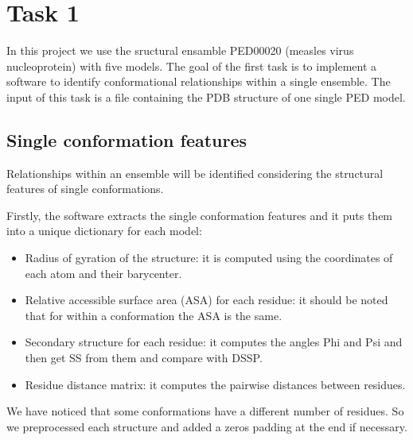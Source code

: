 \section{Task 1}\label{sec:task1}
\graphicspath{ {./figures/} }

In this project we use the sructural ensamble PED00020 (measles virus nucleoprotein) with five models.
The goal of the first task is to implement a software to identify conformational relationships within a single ensemble.  The input of this task is a file containing the PDB structure of one single PED model.


\subsection{Single conformation features}
Relationships within an ensemble will be identified considering the structural features of single conformations.

Firstly, the software extracts the single conformation features and it puts them into a unique dictionary for each model:
\begin{itemize}
\item Radius of gyration of the structure: it is computed using the coordinates of each atom and their barycenter.
\item Relative accessible surface area (ASA) for each residue: it should be noted that for within a conformation the ASA is the same.
\item Secondary structure for each residue: it computes the angles Phi and Psi and then get SS from them and compare with DSSP.
\item Residue distance matrix: it computes the pairwise distances between residues.
\end{itemize}

We have noticed that some conformations have a different number of residues. So we preprocessed each structure and added a zeros padding at the end if necessary.

